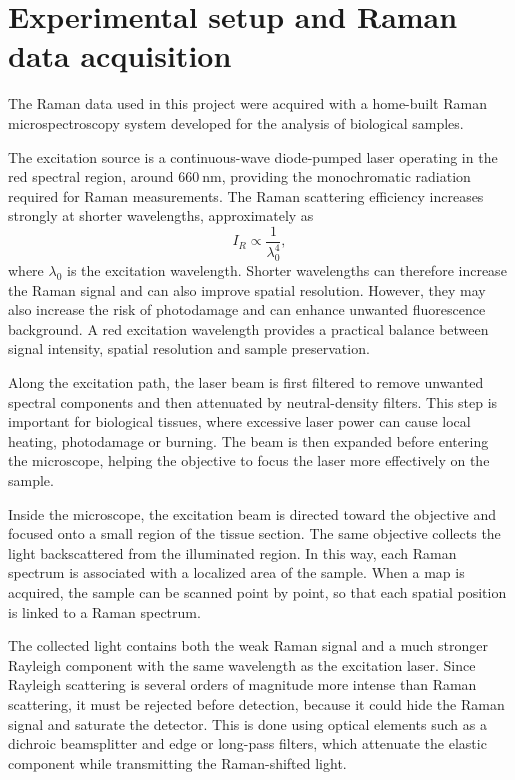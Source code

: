 \section{Experimental setup and Raman data acquisition}
\label{sec:experimental_setup}

The Raman data used in this project were acquired with a home-built Raman microspectroscopy system developed for the analysis of biological samples. 

The excitation source is a continuous-wave diode-pumped laser operating in the red spectral region, around \(660~\mathrm{nm}\), providing the monochromatic radiation required for Raman measurements.
The Raman scattering efficiency increases strongly at shorter wavelengths, approximately as
\begin{equation}
    I_R \propto \frac{1}{\lambda_0^4},
    \label{eq:lambda_dependence}
\end{equation}
where \(\lambda_0\) is the excitation wavelength.
Shorter wavelengths can therefore increase the Raman signal and can also improve spatial resolution. However, they may also increase the risk of photodamage and can enhance unwanted fluorescence background. A red excitation wavelength provides a practical balance between signal intensity, spatial resolution and sample preservation.

Along the excitation path, the laser beam is first filtered to remove unwanted spectral components and then attenuated by neutral-density filters. This step is important for biological tissues, where excessive laser power can cause local heating, photodamage or burning. The beam is then expanded before entering the microscope, helping the objective to focus the laser more effectively on the sample.

Inside the microscope, the excitation beam is directed toward the objective and focused onto a small region of the tissue section. The same objective collects the light backscattered from the illuminated region. In this way, each Raman spectrum is associated with a localized area of the sample. When a map is acquired, the sample can be scanned point by point, so that each spatial position is linked to a Raman spectrum.

The collected light contains both the weak Raman signal and a much stronger Rayleigh component with the same wavelength as the excitation laser. Since Rayleigh scattering is several orders of magnitude more intense than Raman scattering, it must be rejected before detection, because it could hide the Raman signal and saturate the detector. This is done using optical elements such as a dichroic beamsplitter and edge or long-pass filters, which attenuate the elastic component while transmitting the Raman-shifted light.


